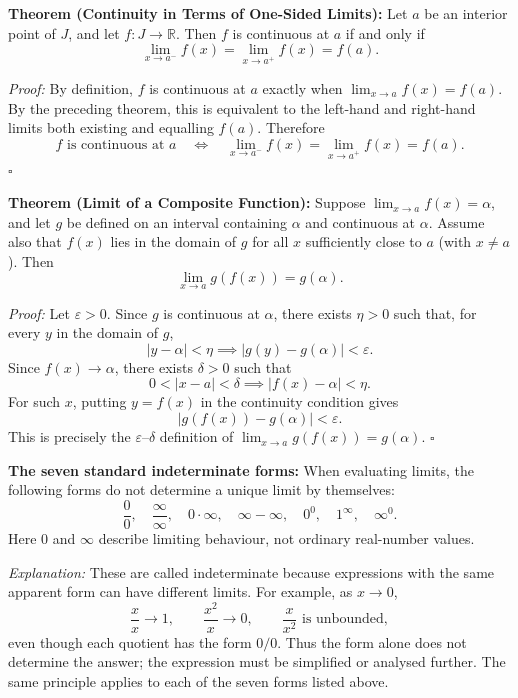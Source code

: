 \documentclass[a4paper,11pt,abstracton]{scrartcl}
\newcommand{\RR}{\mathbb{R}}
\theoremstyle{dotlessP}
\theoremstyle{dotlessS}
\theoremstyle{remark}
\theoremstyle{definition}
\begin{document}
\begin{problem_box}
\textbf{Theorem (Continuity in Terms of One-Sided Limits):}
Let $a$ be an interior point of $J$, and let $f:J\to\RR$. Then $f$ is continuous at $a$ if and only if
\[
\boxed{\lim_{x\to a^-}f(x)=\lim_{x\to a^+}f(x)=f(a).}
\]
\end{problem_box}

\begin{claim_box}
\textit{Proof:}
By definition, $f$ is continuous at $a$ exactly when $\lim_{x\to a}f(x)=f(a)$. By the preceding theorem, this is equivalent to the left-hand and right-hand limits both existing and equalling $f(a)$. Therefore
\[
f\text{ is continuous at }a
\quad\Longleftrightarrow\quad
\lim_{x\to a^-}f(x)=\lim_{x\to a^+}f(x)=f(a).
\]
\hfill$\square$
\end{claim_box}

\begin{problem_box}
\textbf{Theorem (Limit of a Composite Function):}
Suppose $\lim_{x\to a}f(x)=\alpha$, and let $g$ be defined on an interval containing $\alpha$ and continuous at $\alpha$. Assume also that $f(x)$ lies in the domain of $g$ for all $x$ sufficiently close to $a$ (with $x\ne a$). Then
\[
\boxed{\lim_{x\to a}g(f(x))=g(\alpha).}
\]
\end{problem_box}

\begin{claim_box}
\textit{Proof:}
Let $\varepsilon>0$. Since $g$ is continuous at $\alpha$, there exists $\eta>0$ such that, for every $y$ in the domain of $g$,
\[
|y-\alpha|<\eta\implies |g(y)-g(\alpha)|<\varepsilon.
\]
Since $f(x)\to\alpha$, there exists $\delta>0$ such that
\[
0<|x-a|<\delta\implies |f(x)-\alpha|<\eta.
\]
For such $x$, putting $y=f(x)$ in the continuity condition gives
\[
|g(f(x))-g(\alpha)|<\varepsilon.
\]
This is precisely the $\varepsilon$--$\delta$ definition of $\lim_{x\to a}g(f(x))=g(\alpha)$.
\hfill$\square$
\end{claim_box}

\begin{problem_box}
\textbf{The seven standard indeterminate forms:}
When evaluating limits, the following forms do not determine a unique limit by themselves:
\[
\boxed{
\frac00,\quad \frac{\infty}{\infty},\quad 0\cdot\infty,\quad
\infty-\infty,\quad 0^0,\quad 1^\infty,\quad \infty^0.
}
\]
Here $0$ and $\infty$ describe limiting behaviour, not ordinary real-number values.
\end{problem_box}

\begin{claim_box}
\textit{Explanation:}
These are called indeterminate because expressions with the same apparent form can have different limits. For example, as $x\to0$,
\[
\frac{x}{x}\to1,\qquad \frac{x^2}{x}\to0,\qquad \frac{x}{x^2}\text{ is unbounded},
\]
even though each quotient has the form $0/0$. Thus the form alone does not determine the answer; the expression must be simplified or analysed further. The same principle applies to each of the seven forms listed above.
\end{claim_box}
\end{document}
